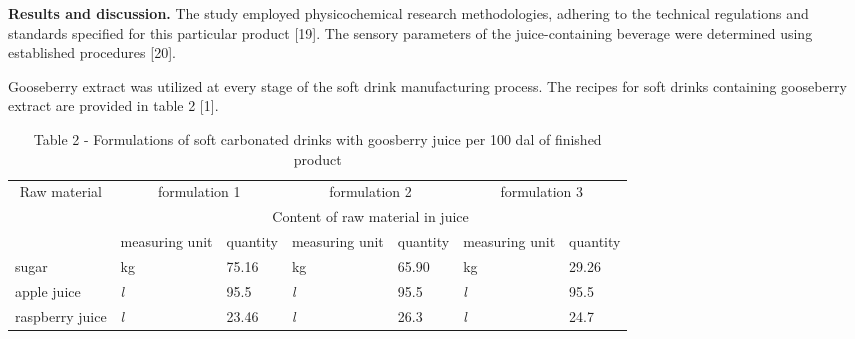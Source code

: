 \begin{multicols}{2}
{\bfseries Results and discussion.} The study employed physicochemical
research methodologies, adhering to the technical regulations and
standards specified for this particular product {[}19{]}. The sensory
parameters of the juice-containing beverage were determined using
established procedures {[}20{]}.~

Gooseberry extract was utilized at every stage of the soft drink
manufacturing process. The recipes for soft drinks containing gooseberry
extract are provided in table 2 {[}1{]}.

\end{multicols}


\begin{table}[H]
  \caption*{Table 2 - Formulations of soft carbonated drinks with goosberry
juice per 100 dal of finished product}
  \begin{tabular}{|lllllll|}
  \hline
  \multicolumn{1}{|c|}{\multirow{3}{*}{Raw material}} & \multicolumn{2}{c|}{formulation 1}                                  & \multicolumn{2}{c|}{formulation 2}                                  & \multicolumn{2}{c|}{formulation 3}             \\ \cline{2-7} 
  \multicolumn{1}{|c|}{}                              & \multicolumn{6}{c|}{Content of raw material in juice}                                                                                                                                      \\ \cline{2-7} 
  \multicolumn{1}{|c|}{}                              & \multicolumn{1}{l|}{measuring unit} & \multicolumn{1}{l|}{quantity} & \multicolumn{1}{l|}{measuring unit} & \multicolumn{1}{l|}{quantity} & \multicolumn{1}{l|}{measuring unit} & quantity \\ \hline
  \multicolumn{1}{|l|}{sugar}                         & \multicolumn{1}{l|}{kg}             & \multicolumn{1}{l|}{75.16}    & \multicolumn{1}{l|}{kg}             & \multicolumn{1}{l|}{65.90}    & \multicolumn{1}{l|}{kg}             & 29.26    \\ \hline
  \multicolumn{1}{|l|}{apple juice}                   & \multicolumn{1}{l|}{\textit{l}}     & \multicolumn{1}{l|}{95.5}     & \multicolumn{1}{l|}{\textit{l}}     & \multicolumn{1}{l|}{95.5}     & \multicolumn{1}{l|}{\textit{l}}     & 95.5     \\ \hline
  \multicolumn{1}{|l|}{raspberry juice}               & \multicolumn{1}{l|}{\textit{l}}     & \multicolumn{1}{l|}{23.46}    & \multicolumn{1}{l|}{\textit{l}}     & \multicolumn{1}{l|}{26.3}     & \multicolumn{1}{l|}{\textit{l}}     & 24.7     \\ \hline

\end{tabular}
\end{table}

